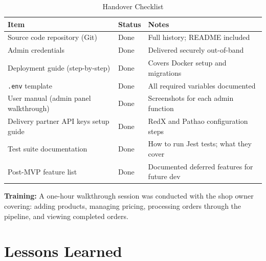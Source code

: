 \documentclass[12pt,a4paper]{report}
\begin{document}
\begin{table}[H]
  \centering
  \caption{Handover Checklist}
  \begin{tabularx}{\textwidth}{L{5cm} C{2cm} X}
    \toprule
    \textbf{Item} & \textbf{Status} & \textbf{Notes} \\
    \midrule
    Source code repository (Git)            & Done & Full history; README included \\
    Admin credentials                       & Done & Delivered securely out-of-band \\
    Deployment guide (step-by-step)         & Done & Covers Docker setup and migrations \\
    \texttt{.env} template                  & Done & All required variables documented \\
    User manual (admin panel walkthrough)   & Done & Screenshots for each admin function \\
    Delivery partner API keys setup guide   & Done & RedX and Pathao configuration steps \\
    Test suite documentation                & Done & How to run Jest tests; what they cover \\
    Post-MVP feature list                   & Done & Documented deferred features for future dev \\
    \bottomrule
  \end{tabularx}
\end{table}

\textbf{Training:} A one-hour walkthrough session was conducted with the shop owner covering: adding products, managing pricing, processing orders through the pipeline, and viewing completed orders.

\section{Lessons Learned}
\end{document}
